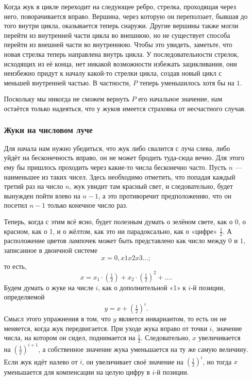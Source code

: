 Когда жук в цикле переходит на следующее ребро, стрелка, проходящая через него, поворачивается вправо.
Вершина, через которую он переползает, бывшая до того внутри цикла, оказывается теперь снаружи.
Другие вершины также могли перейти из внутренней части цикла во внешнюю, но не существует способа перейти из внешней части во внутреннюю.
Чтобы это увидеть, заметьте, что новая стрелка теперь направлена внутрь цикла.
У последовательности стрелок, исходящих из её конца, нет никакой возможности избежать зацикливания, они неизбежно придут к началу какой-то стрелки цикла, создав новый цикл с меньшей внутренней частью.
В частности, $P$ теперь уменьшилось хотя бы на $1$.

Поскольку мы никогда не сможем вернуть $P$ его начальное значение, нам остаётся только надеяться, что у жуков имеется страховка от несчастного случая.
\heart

\subsubsection*{Жуки на числовом луче}%

Для начала нам нужно убедиться, что жук либо свалится с луча слева, либо уйдёт на бесконечность вправо, он не может бродить туда-сюда вечно.
Для этого ему бы пришлось проходить через какие-то числа бесконечно часто.
Пусть $n$ --- наименьшее из таких чисел.
Здесь необходимо отметить, что попадая каждый третий раз на число $n$, жук увидит там красный свет, и следовательно, будет вынужден пойти влево на $n-1$, а это противоречит предположению, что он посетил $n-1$ только конечное число раз.

Теперь, когда с этим всё ясно, будет полезным думать о зелёном свете, как о 0, о красном, как о 1, и о жёлтом, как это ни парадоксально, как о «цифре» $\tfrac12$.
А расположение цветов лампочек может быть представлено как число между $0$ и $1$, записанное в двоичной системе
\[x = 0{,}x1x2x3\dots;\]
то есть,
 \[x = x_1\cdot(\tfrac12)+x_2\cdot(\tfrac12)^2+\dots.\]
Будем думать о жуке на числе $i$, как о дополнительной «1» к $i$-й позиции, определяемой 
\[y=x+(\tfrac12)^i.\]
Смысл этого упражнения в том, что $y$ является инвариантом, то есть он не меняется, когда жук передвигается.
При уходе жука вправо от точки $i$, значение числа, на котором он сидел, поднимается на $\tfrac12$.
Следовательно, $x$ увеличивается на $(\tfrac12)^{i+1}$, а собственное значение жука уменьшается на ту же самую величину.
Если жук идёт налево от $i$, он увеличивает своё значение на $(\tfrac12)^i$, но тогда $x$ уменьшается для компенсации на целую цифру в $i$-й позиции.

